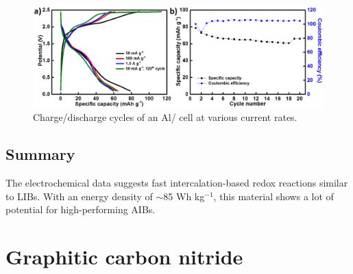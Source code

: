 \begin{figure}[th!]
\centering
\includegraphics[width=\textwidth]{Figures/chap6fig/MoO3cdcce}
\caption{Charge/discharge cycles of an Al/ cell at various current rates.}
\label{Figures/chap6fig:MoO3cdcce}
\end{figure}

\subsection{Summary}
The electrochemical data suggests fast intercalation-based redox reactions similar to LIBs. With an energy density of $\sim$85 Wh kg$^{-1}$, this material shows a lot of potential for high-performing AIBs. 


\section{Graphitic carbon nitride}

